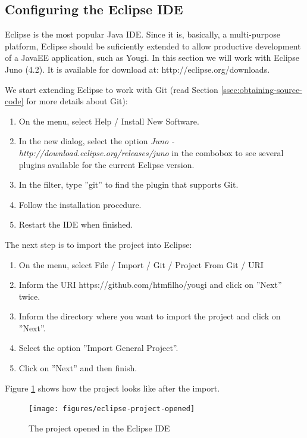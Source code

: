 \documentclass[envcountsame,envcountchap]{svmono}
\begin{document}
\subsection{Configuring the Eclipse IDE}

Eclipse is the most popular Java IDE. Since it is, basically, a multi-purpose platform, Eclipse should be suficiently extended to allow productive development of a JavaEE application, such as Yougi. In this section we will work with Eclipse Juno (4.2). It is available for download at: http://eclipse.org/downloads.

We start extending Eclipse to work with Git (read Section \ref{ssec:obtaining-source-code} for more details about Git):
\begin{enumerate}
\item On the menu, select Help / Install New Software.
\item In the new dialog, select the option \textit{Juno - http://download.eclipse.org/releases/juno} in the combobox to see several plugins available for the current Eclipse version.
\item In the filter, type ''git'' to find the plugin that supports Git.
\item Follow the installation procedure.
\item Restart the IDE when finished.
\end{enumerate}

The next step is to import the project into Eclipse:
\begin{enumerate}
\item On the menu, select File / Import / Git / Project From Git / URI
\item Inform the URI https://github.com/htmfilho/yougi and click on ''Next'' twice.
\item Inform the directory where you want to import the project and click on ''Next''.
\item Select the option ''Import General Project''.
\item Click on ''Next'' and then finish.
\end{enumerate}

Figure \ref{fig:eclipse-project-opened} shows how the project looks like after the import. 

\begin{figure}
\centering
\texttt{[image: figures/eclipse-project-opened]}
\caption{The project opened in the Eclipse IDE}
\label{fig:eclipse-project-opened}
\end{figure}
\end{document}
